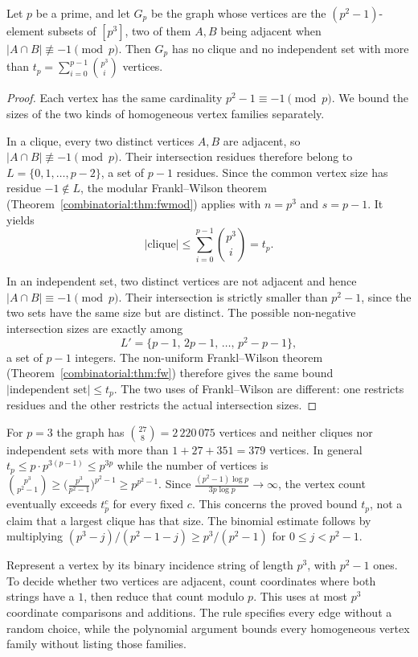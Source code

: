 \begin{theorem}\label{combinatorial:thm:explicitramsey}
Let $p$ be a prime, and let $G_p$ be the graph whose vertices are the $(p^2-1)$-element subsets of $[p^3]$, two of them $A,B$ being adjacent when $|A\cap B|\not\equiv-1\pmod p$. Then $G_p$ has no clique and no
independent set with more than $t_p=\sum_{i=0}^{p-1}\binom{p^3}i$ vertices.
\end{theorem}
\begin{proof}
Each vertex has the same cardinality
$p^2-1\equiv-1\pmod p$. We bound the sizes
of the two kinds of homogeneous vertex families
separately.

In a clique, every two distinct vertices
$A,B$ are adjacent, so
$|A\cap B|\not\equiv-1\pmod p$.
Their intersection residues therefore belong
to $L=\{0,1,\ldots,p-2\}$, a set of
$p-1$ residues. Since the common vertex size
has residue $-1\notin L$, the modular
Frankl--Wilson theorem
(Theorem~\ref{combinatorial:thm:fwmod})
applies with $n=p^3$ and $s=p-1$. It yields
\[
|\text{clique}|\le
\sum_{i=0}^{p-1}\binom{p^3}{i}=t_p.
\]

In an independent set, two distinct vertices
are not adjacent and hence
$|A\cap B|\equiv-1\pmod p$.
Their intersection is strictly smaller than
$p^2-1$, since the two sets have the same
size but are distinct. The possible
non-negative intersection sizes are exactly
among
\[
L'=\{p-1,\,2p-1,\,\ldots,\,p^2-p-1\},
\]
a set of $p-1$ integers. The non-uniform
Frankl--Wilson theorem
(Theorem~\ref{combinatorial:thm:fw})
therefore gives the same bound
$|\text{independent set}|\le t_p$.
The two uses of Frankl--Wilson are different:
one restricts residues and the other restricts
the actual intersection sizes.
\end{proof}

For $p=3$ the graph has $\binom{27}8=2\,220\,075$ vertices and neither cliques nor independent sets with more than $1+27+351=379$ vertices. In general $t_p\le p\cdot p^{3(p-1)}\le p^{3p}$ while the number of vertices is
$\binom{p^3}{p^2-1}\ge\bigl(\frac{p^3}{p^2-1}\bigr)^{p^2-1}\ge p^{p^2-1}$. Since $\frac{(p^2-1)\log p}{3p\log p}\to\infty$, the vertex count
eventually exceeds $t_p^c$ for every fixed $c$. This concerns the proved
bound $t_p$, not a claim that a largest clique has that size.
The binomial estimate follows by multiplying
$(p^3-j)/(p^2-1-j)\ge p^3/(p^2-1)$ for $0\le j<p^2-1$.

\begin{remark}
Represent a vertex by its binary incidence string of length $p^3$, with
$p^2-1$ ones. To decide whether two vertices are adjacent, count coordinates
where both strings have a $1$, then reduce that count modulo $p$.
This uses at most $p^3$ coordinate comparisons and additions. The rule specifies
every edge without a random choice, while the polynomial argument bounds
every homogeneous vertex family without listing those families.
\end{remark}

